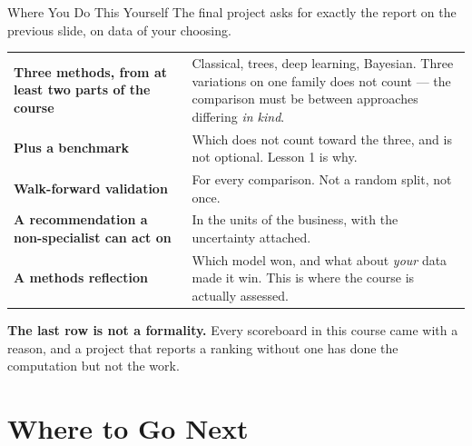 \documentclass[aspectratio=169, 11pt]{beamer}
\begin{document}
\begin{frame}{Where You Do This Yourself}
  The final project asks for exactly the report on the previous slide, on data of your choosing.

  \begin{center}
    {\small
    \begin{tabular}{p{3.6cm}p{8.7cm}}
      \toprule
      \textbf{Three methods, from at least two parts of the course} & Classical, trees, deep
      learning, Bayesian. Three variations on one family does not count --- the comparison must be
      between approaches differing \emph{in kind}. \\[3pt]
      \textbf{Plus a benchmark} & Which does not count toward the three, and is not optional.
      Lesson 1 is why. \\[3pt]
      \textbf{Walk-forward validation} & For every comparison. Not a random split, not once. \\[3pt]
      \textbf{A recommendation a non-specialist can act on} & In the units of the business, with
      the uncertainty attached. \\[3pt]
      \textbf{A methods reflection} & Which model won, and what about \emph{your} data made it
      win. This is where the course is actually assessed. \\
      \bottomrule
    \end{tabular}
    }
  \end{center}

  \vspace{-0.05cm}
  \textbf{The last row is not a formality.} Every scoreboard in this course came with a reason,
  and a project that reports a ranking without one has done the computation but not the work.
\end{frame}

\section{Where to Go Next}

\end{document}
